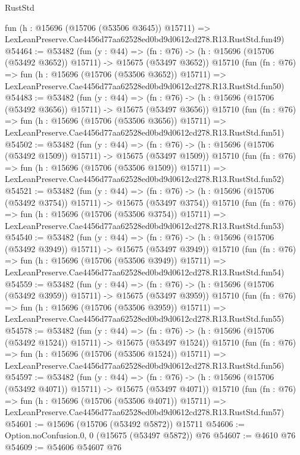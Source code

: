 \begin{lexlean}{RustStd}
\begin{coremodule}
    fun (h : @15696 (@15706 (@53506 @3645)) @15711) =>
    LexLeanPreserve.Cae4456d77aa62528ed0bd9d0612cd278.R13.RustStd.fun49)
@54464 := @53482
    (fun (y : @44) =>
    (fn : @76) -> (h : @15696 (@15706 (@53492 @3652)) @15711) -> @15675 (@53497 @3652))
    @15710
    (fun (fn : @76) =>
    fun (h : @15696 (@15706 (@53506 @3652)) @15711) =>
    LexLeanPreserve.Cae4456d77aa62528ed0bd9d0612cd278.R13.RustStd.fun50)
@54483 := @53482
    (fun (y : @44) =>
    (fn : @76) -> (h : @15696 (@15706 (@53492 @3656)) @15711) -> @15675 (@53497 @3656))
    @15710
    (fun (fn : @76) =>
    fun (h : @15696 (@15706 (@53506 @3656)) @15711) =>
    LexLeanPreserve.Cae4456d77aa62528ed0bd9d0612cd278.R13.RustStd.fun51)
@54502 := @53482
    (fun (y : @44) =>
    (fn : @76) -> (h : @15696 (@15706 (@53492 @1509)) @15711) -> @15675 (@53497 @1509))
    @15710
    (fun (fn : @76) =>
    fun (h : @15696 (@15706 (@53506 @1509)) @15711) =>
    LexLeanPreserve.Cae4456d77aa62528ed0bd9d0612cd278.R13.RustStd.fun52)
@54521 := @53482
    (fun (y : @44) =>
    (fn : @76) -> (h : @15696 (@15706 (@53492 @3754)) @15711) -> @15675 (@53497 @3754))
    @15710
    (fun (fn : @76) =>
    fun (h : @15696 (@15706 (@53506 @3754)) @15711) =>
    LexLeanPreserve.Cae4456d77aa62528ed0bd9d0612cd278.R13.RustStd.fun53)
@54540 := @53482
    (fun (y : @44) =>
    (fn : @76) -> (h : @15696 (@15706 (@53492 @3949)) @15711) -> @15675 (@53497 @3949))
    @15710
    (fun (fn : @76) =>
    fun (h : @15696 (@15706 (@53506 @3949)) @15711) =>
    LexLeanPreserve.Cae4456d77aa62528ed0bd9d0612cd278.R13.RustStd.fun54)
@54559 := @53482
    (fun (y : @44) =>
    (fn : @76) -> (h : @15696 (@15706 (@53492 @3959)) @15711) -> @15675 (@53497 @3959))
    @15710
    (fun (fn : @76) =>
    fun (h : @15696 (@15706 (@53506 @3959)) @15711) =>
    LexLeanPreserve.Cae4456d77aa62528ed0bd9d0612cd278.R13.RustStd.fun55)
@54578 := @53482
    (fun (y : @44) =>
    (fn : @76) -> (h : @15696 (@15706 (@53492 @1524)) @15711) -> @15675 (@53497 @1524))
    @15710
    (fun (fn : @76) =>
    fun (h : @15696 (@15706 (@53506 @1524)) @15711) =>
    LexLeanPreserve.Cae4456d77aa62528ed0bd9d0612cd278.R13.RustStd.fun56)
@54597 := @53482
    (fun (y : @44) =>
    (fn : @76) -> (h : @15696 (@15706 (@53492 @4071)) @15711) -> @15675 (@53497 @4071))
    @15710
    (fun (fn : @76) =>
    fun (h : @15696 (@15706 (@53506 @4071)) @15711) =>
    LexLeanPreserve.Cae4456d77aa62528ed0bd9d0612cd278.R13.RustStd.fun57)
@54601 := @15696 (@15706 (@53492 @5872)) @15711
@54606 := Option.noConfusion.{0, 0} (@15675 (@53497 @5872)) @76
@54607 := @4610 @76
@54609 := @54606 @54607 @76

\end{coremodule}
\end{lexlean}
